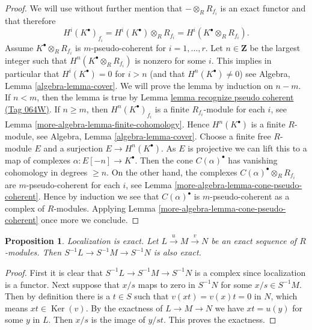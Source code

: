 \documentclass{amsart}
\newenvironment{slogan}{\comment}{\endcomment}
\theoremstyle{plain}
\newtheorem{proposition}[subsection]{Proposition}
\theoremstyle{definition}
\theoremstyle{remark}
\numberwithin{equation}{subsection}
\def\Ker{\mathop{\mathrm{Ker}}}
\begin{document}
\begin{proof}
We will use without further mention that $- \otimes_R R_{f_i}$ is
an exact functor and that therefore
$$
H^i(K^\bullet)_{f_i} =
H^i(K^\bullet) \otimes_R R_{f_i} = H^i(K^\bullet \otimes_R R_{f_i}).
$$
Assume $K^\bullet \otimes_R R_{f_i}$ is $m$-pseudo-coherent
for $i = 1, \ldots, r$. Let $n \in \mathbf{Z}$ be the largest
integer such that $H^n(K^\bullet \otimes_R R_{f_i})$ is nonzero
for some $i$. This implies in particular that $H^i(K^\bullet) = 0$
for $i > n$ (and that $H^n(K^\bullet) \not = 0$) see
Algebra, Lemma \ref{algebra-lemma-cover}.
We will prove the lemma by induction on $n - m$.
If $n < m$, then the lemma is true by
Lemma \href{https://stacks.math.columbia.edu/tag/064W}{lemma recognize pseudo coherent (Tag 064W)}.
If $n \geq m$, then $H^n(K^\bullet)_{f_i}$ is a finite $R_{f_i}$-module
for each $i$, see
Lemma \ref{more-algebra-lemma-finite-cohomology}.
Hence $H^n(K^\bullet)$ is a finite $R$-module, see
Algebra, Lemma \ref{algebra-lemma-cover}.
Choose a finite free $R$-module $E$ and a surjection $E \to H^n(K^\bullet)$.
As $E$ is projective we can lift this to a map of complexes
$\alpha : E[-n] \to K^\bullet$. Then the cone $C(\alpha)^\bullet$ has
vanishing cohomology in degrees $\geq n$. On the other hand, the
complexes $C(\alpha)^\bullet \otimes_R R_{f_i}$ are $m$-pseudo-coherent
for each $i$, see
Lemma \ref{more-algebra-lemma-cone-pseudo-coherent}.
Hence by induction we see that $C(\alpha)^\bullet$ is $m$-pseudo-coherent
as a complex of $R$-modules. Applying
Lemma \ref{more-algebra-lemma-cone-pseudo-coherent}
once more we conclude.
\end{proof}


\begin{proposition}
\label{algebra-proposition-localization-exact}
\begin{slogan}
Localization is exact.
\end{slogan}
Let $L\xrightarrow{u} M\xrightarrow{v} N$ be an exact sequence
of $R$-modules. Then
$S^{-1}L \to S^{-1}M \to S^{-1}N$ is also exact.
\end{proposition}

\begin{proof}
First it is clear that $S^{-1}L \to S^{-1}M \to S^{-1}N$ is a complex
since localization is a functor. Next suppose that $x/s$ maps to zero
in $S^{-1}N$ for some $x/s \in S^{-1}M$. Then by definition there is a
$t\in S$ such that $v(xt) = v(x)t = 0$ in $N$, which means
$xt \in \Ker(v)$. By the exactness of $L \to M \to N$ we have
$xt = u(y)$ for some $y$ in $L$. Then $x/s$ is the image of $y/st$.
This proves the exactness.
\end{proof}
\end{document}
